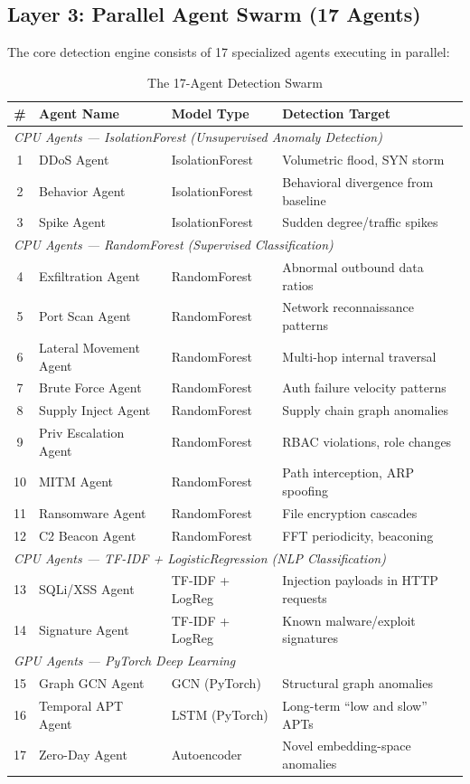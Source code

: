 \documentclass[12pt, a4paper]{report}
\begin{document}
\subsection{Layer 3: Parallel Agent Swarm (17 Agents)}

The core detection engine consists of 17 specialized agents executing in parallel:

\begin{table}[H]
\centering
\caption{The 17-Agent Detection Swarm}
\label{tab:agent_swarm}
\small
\begin{tabularx}{\textwidth}{c l l X}
\toprule
\textbf{\#} & \textbf{Agent Name} & \textbf{Model Type} & \textbf{Detection Target} \\
\midrule
\multicolumn{4}{l}{\textit{CPU Agents — IsolationForest (Unsupervised Anomaly Detection)}} \\
\midrule
1 & DDoS Agent & IsolationForest & Volumetric flood, SYN storm \\
2 & Behavior Agent & IsolationForest & Behavioral divergence from baseline \\
3 & Spike Agent & IsolationForest & Sudden degree/traffic spikes \\
\midrule
\multicolumn{4}{l}{\textit{CPU Agents — RandomForest (Supervised Classification)}} \\
\midrule
4 & Exfiltration Agent & RandomForest & Abnormal outbound data ratios \\
5 & Port Scan Agent & RandomForest & Network reconnaissance patterns \\
6 & Lateral Movement Agent & RandomForest & Multi-hop internal traversal \\
7 & Brute Force Agent & RandomForest & Auth failure velocity patterns \\
8 & Supply Inject Agent & RandomForest & Supply chain graph anomalies \\
9 & Priv Escalation Agent & RandomForest & RBAC violations, role changes \\
10 & MITM Agent & RandomForest & Path interception, ARP spoofing \\
11 & Ransomware Agent & RandomForest & File encryption cascades \\
12 & C2 Beacon Agent & RandomForest & FFT periodicity, beaconing \\
\midrule
\multicolumn{4}{l}{\textit{CPU Agents — TF-IDF + LogisticRegression (NLP Classification)}} \\
\midrule
13 & SQLi/XSS Agent & TF-IDF + LogReg & Injection payloads in HTTP requests \\
14 & Signature Agent & TF-IDF + LogReg & Known malware/exploit signatures \\
\midrule
\multicolumn{4}{l}{\textit{GPU Agents — PyTorch Deep Learning}} \\
\midrule
15 & Graph GCN Agent & GCN (PyTorch) & Structural graph anomalies \\
16 & Temporal APT Agent & LSTM (PyTorch) & Long-term ``low and slow'' APTs \\
17 & Zero-Day Agent & Autoencoder & Novel embedding-space anomalies \\
\bottomrule
\end{tabularx}
\end{table}
\end{document}

